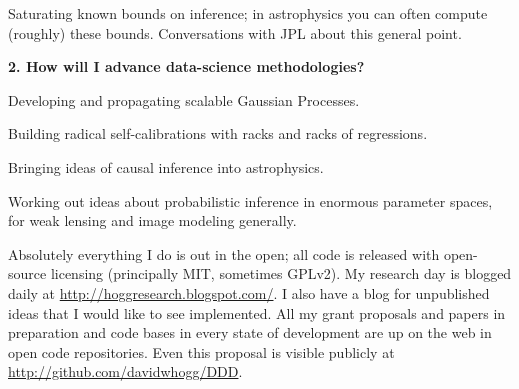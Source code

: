 \documentclass[11pt, letterpaper]{article}
\begin{document}
Saturating known bounds on inference; in astrophysics you can often
compute (roughly) these bounds.  Conversations with JPL about this
general point.

\bigskip
\noindent\textbf{2. How will I advance data-science methodologies?}
\smallskip

Developing and propagating scalable Gaussian Processes.

Building radical self-calibrations with racks and racks of regressions.

Bringing ideas of causal inference into astrophysics.

Working out ideas about probabilistic inference in enormous parameter spaces,
for weak lensing and image modeling generally.

Absolutely everything I do is out in the open; all code is released
with open-source licensing (principally MIT, sometimes GPLv2).
My research day is blogged daily at
\url{http://hoggresearch.blogspot.com/}.
I also have a blog for unpublished ideas that I would like to see
implemented.
All my grant proposals and papers in preparation and code bases in
every state of development are up on the web in open code
repositories.
Even this proposal is visible publicly at
\url{http://github.com/davidwhogg/DDD}.
\end{document}
